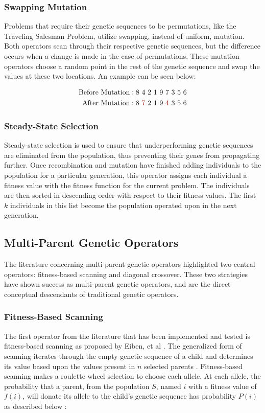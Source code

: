 \subsubsection*{Swapping Mutation}
Problems that require their genetic sequences to be permutations, like the Traveling Salesman Problem, utilize swapping, instead of uniform, mutation. Both operators scan through their respective genetic sequences, but the difference occurs when a change is made in the case of permutations. These mutation operators choose a random point in the rest of the genetic sequence and swap the values at these two locations. An example can be seen below:

\begin{align*}
\text{Before Mutation} &: 8~4~2~1~9~7~3~5~6 			\\
\text{After Mutation} &:  8~{\color{myred}7}~2~1~9~{\color{myred}4}~3~5~6		
\end{align*}

\subsubsection*{Steady-State Selection}
Steady-state selection is used to ensure that underperforming genetic sequences are eliminated from the population, thus preventing their genes from propagating further. Once recombination and mutation have finished adding individuals to the population for a particular generation, this operator assigns each individual a fitness value with the fitness function for the current problem. The individuals are then sorted in descending order with respect to their fitness values. The first $k$ individuals in this list become the population operated upon in the next generation.

\subsection*{Multi-Parent Genetic Operators}
The literature concerning multi-parent genetic operators highlighted two central operators: fitness-based scanning and diagonal crossover. These two strategies have shown success as multi-parent genetic operators, and are the direct conceptual descendants of traditional genetic operators.

\subsubsection*{Fitness-Based Scanning}
The first operator from the literature that has been implemented and tested is fitness-based scanning as proposed by Eiben, et al \cite{Eiben94}. The generalized form of scanning iterates through the empty genetic sequence of a child and determines its value based upon the values present in $n$ selected parents \cite{Eiben91}. Fitness-based scanning makes a roulette wheel selection to choose each allele. At each allele, the probability that a parent, from the population $S$, named $i$ with a fitness value of $f(i)$, will donate its allele to the child's genetic sequence has probability $P(i)$ as described below \cite{Eiben94}: 

